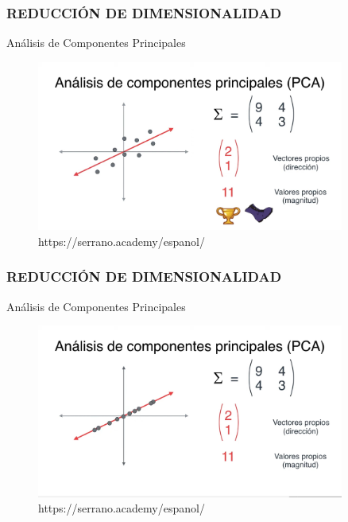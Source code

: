 \documentclass{beamer}
\begin{document}
\begin{frame}
	\frametitle{REDUCCIÓN DE DIMENSIONALIDAD}
	\begin{block}{Análisis de Componentes Principales}	
		\begin{figure}
			\includegraphics[width=0.9\textwidth]{PCA/IMG_3586.jpg}
			\caption{https://serrano.academy/espanol/}
		\end{figure}
	\end{block}
\end{frame}

\begin{frame}
	\frametitle{REDUCCIÓN DE DIMENSIONALIDAD}
	\begin{block}{Análisis de Componentes Principales}	
		\begin{figure}
			\includegraphics[width=0.9\textwidth]{PCA/IMG_3587.jpg}
			\caption{https://serrano.academy/espanol/}
		\end{figure}
	\end{block}
\end{frame}
\end{document}
